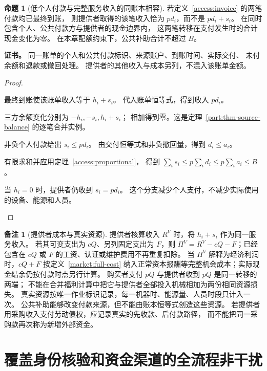 \documentclass[UTF8,12pt,a4paper,openany,fontset=none,zihao=false]{ctexrep}
\theoremstyle{definition}
\newtheorem{proposition}{命题}[chapter]
\newtheorem{remark}{备注}[chapter]
\newenvironment{certificate}{\par\noindent\textbf{证书。}\ignorespaces}{\par}
\newcommand{\1}{\mathbf 1}
\begin{document}
\begin{proposition}[低个人付款与完整服务收入的同账本相容]
\label{access:payment-identity}
若定义~\ref{access:invoice} 的两笔付款均已最终到账，
则提供者取得的该笔收入恰为 \(pd_i\)，而不是 \(pd_i+s_i\)。
在同时包含个人、公共付款方与提供者的现金边界内，
这两笔转移在支付发生时的合计现金变化为零。
在本章配额约束下，公共补助合计不超过 \(B\)。
\end{proposition}
\begin{certificate}
同一账单的个人和公共付款标识、来源账户、到账时间、实际交付、
未付余额和退款或撤回处理。
提供者的其他收入与成本另列，不混入该账单金额。
\end{certificate}
\begin{proof}
\begin{semanticsteps}
\item 最终到账使该账单收入等于 \(h_i+s_i\)。
代入账单恒等式，得到收入 \(pd_i\)。
\item 三方余额变化分别为 \(-h_i,-s_i,h_i+s_i\)；
相加得到零。这是定理~\ref{part:thm-source-balance} 的逐笔合并实例。
\item 非负个人付款给出 \(s_i\le pd_i\)。
由交付恒等式和非负撤回量，得到 \(d_i\le a_i\)。
\item 有限求和并应用定理~\ref{access:proportional}，
得到 \(\sum_i s_i\le p\sum_i d_i\le p\sum_i a_i\le B\)。
\item 当 \(h_i=0\) 时，提供者仍收到 \(s_i=pd_i\)。
这个分支减少个人支付，不减少实际使用的设备、能源和人员。
\end{semanticsteps}
\end{proof}

\begin{remark}[提供者成本与真实资源]
提供者核算收入 \(R^V\) 时，将 \(h_i+s_i\) 作为同一服务收入。
若其可变支出为 \(cQ\)、另列固定支出为 \(F\)，则
\(\Pi^V=R^V-cQ-F\)；已经包含在 \(cQ\) 或 \(F\) 的工资、认证或维护费用不再重复扣除。
当 \(\Pi^V\) 解释为经济利润时，\(cQ+F\) 按定义~\ref{market:full-cost}
纳入正常资本报酬等完整机会成本；实际现金结余仍按付款时点另行计算。
购买者支付 \(pQ\) 与提供者收到 \(pQ\) 是同一转移的两端；
不能在合并福利计算中把它与提供者全部投入机械相加为两份相同资源损失。
真实资源按唯一作业标识记录，每一机器时、能源量、人员时段只计入一次。
公共补助能够改变付款来源，但不能由账本恒等式创造这些资源。
若提供者用采购收入支付劳动债权，应记录真实的先收款、后付款路径，
而不能把同一采购款再次称为新增外部资金。
\end{remark}

\section{覆盖身份核验和资金渠道的全流程非干扰}
\end{document}
